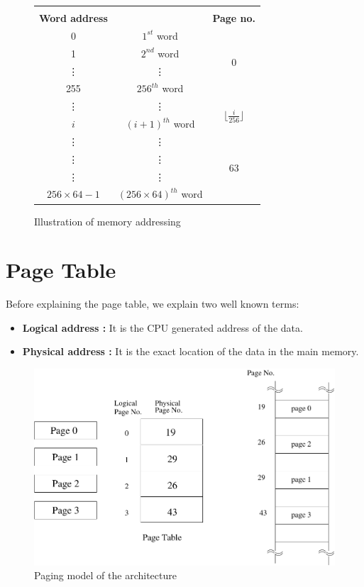 \begin{figure}[htp!] \small
	\centering
	\begin{tabular}{c|c|c|} 
		\multicolumn{3}{c}{} \\
		\textbf{Word address} &  & \textbf{Page no.} \\ \cline{2-3}
		0 & $1^{st}$ word & \multirow{4}{*}{$0$} \\ \cline{2-2}
		1 & $2^{nd}$ word &  \\ \cline{2-2}
		\vdots & \vdots & \\ \cline{2-2}
		255 & $256^{th}$ word &  \\ \cline{2-3}
	
		\vdots & \vdots & \multirow{2}{*}{$\lfloor \frac{i}{256} \rfloor $} \\ \cline{2-2}
		$i$ & $(i+1)^{th} $ word &  \\ \cline{2-2}
		\vdots &\vdots &  \\ \cline{2-3}
	
		\vdots & \vdots & \multirow{2}{*}{$63$} \\ \cline{2-2}
		\vdots &\vdots &  \\ \cline{2-2}
		$256 \times 64 - 1$ & $(256 \times 64)^{th} $ word &  \\ \cline{2-3}
	\end{tabular}
	\caption{Illustration of memory addressing}
	\label{fig:mem_struct}
\end{figure}

\section{Page Table}

Before explaining the page table, we explain two well known terms:
\begin{itemize}
	\item \textbf{Logical address :} It is the CPU generated address of the data. 
	\item \textbf{Physical address :} It is the exact location of the data in the main memory.
\end{itemize}

\begin{figure}[h!]
	\centering
	\includegraphics[scale=0.55]{pics/paging}
	\caption{Paging model of the \ESIM architecture}
	\label{fig:paging}
\end{figure}

